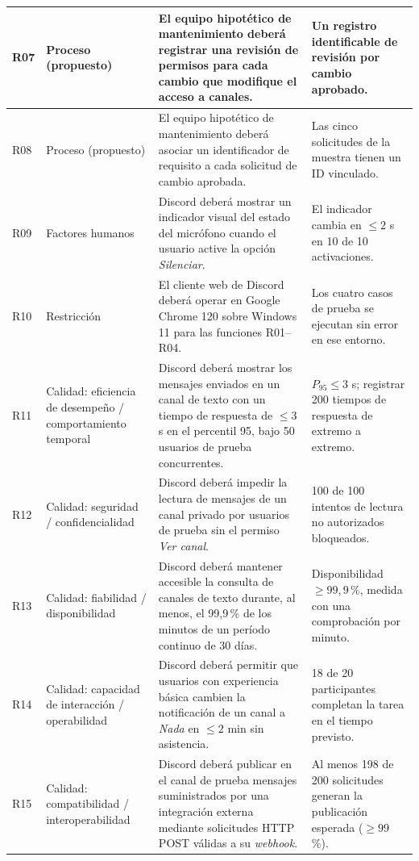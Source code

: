 \documentclass[12pt,a4paper]{article}
\begin{document}
\begin{longtable}{
    |p{0.8cm}
    |p{2.05cm}
    |p{6.65cm}
    |p{4.15cm}|
}
R07 &
Proceso (propuesto) &
El equipo hipotético de mantenimiento deberá registrar una revisión de permisos para cada cambio que modifique el acceso a canales. &
Un registro identificable de revisión por cambio aprobado.\\
\hline

R08 &
Proceso (propuesto) &
El equipo hipotético de mantenimiento deberá asociar un identificador de requisito a cada solicitud de cambio aprobada. &
Las cinco solicitudes de la muestra tienen un ID vinculado.\\
\hline

R09 &
Factores humanos &
Discord deberá mostrar un indicador visual del estado del micrófono cuando el usuario active la opción \emph{Silenciar}. &
El indicador cambia en \(\leq 2\) s en 10 de 10 activaciones.\\
\hline

R10 &
Restricción &
El cliente web de Discord deberá operar en Google Chrome 120 sobre Windows 11 para las funciones R01--R04. &
Los cuatro casos de prueba se ejecutan sin error en ese entorno.\\
\hline

R11 &
Calidad: eficiencia de desempeño / comportamiento temporal &
Discord deberá mostrar los mensajes enviados en un canal de texto con un tiempo de respuesta de \(\leq3\) s en el percentil 95, bajo 50 usuarios de prueba concurrentes. &
\(P_{95}\leq3\) s; registrar 200 tiempos de respuesta de extremo a extremo.\\
\hline

R12 &
Calidad: seguridad / confidencialidad &
Discord deberá impedir la lectura de mensajes de un canal privado por usuarios de prueba sin el permiso \emph{Ver canal}. &
100 de 100 intentos de lectura no autorizados bloqueados.\\
\hline

R13 &
Calidad: fiabilidad / disponibilidad &
Discord deberá mantener accesible la consulta de canales de texto durante, al menos, el 99,9\,\% de los minutos de un período continuo de 30 días. &
Disponibilidad \(\geq99{,}9\)\,\%, medida con una comprobación por minuto.\\
\hline

R14 &
Calidad: capacidad de interacción / operabilidad &
Discord deberá permitir que usuarios con experiencia básica cambien la notificación de un canal a \emph{Nada} en \(\leq2\) min sin asistencia. &
18 de 20 participantes completan la tarea en el tiempo previsto.\\
\hline

R15 &
Calidad: compatibilidad / interoperabilidad &
Discord deberá publicar en el canal de prueba mensajes suministrados por una integración externa mediante solicitudes HTTP POST válidas a su \emph{webhook}. &
Al menos 198 de 200 solicitudes generan la publicación esperada (\(\geq99\)\,\%).\\
\hline

\end{longtable}
\endgroup
\end{document}
